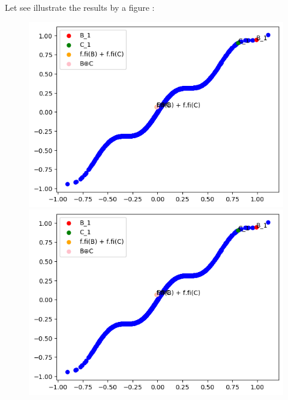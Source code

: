 \documentclass{report}
\begin{document}
            Let see illustrate the results by a figure :
            \begin{figure}[h]
                \centering
                \begin{minipage}{0.5\textwidth}
                \begin{minipage}{0.5\textwidth}
                    \centering
                    \includegraphics[width=0.9\linewidth]{./images/1.png}
                \end{minipage}%
                \begin{minipage}{0.5\textwidth}
                    \includegraphics[width=0.9\linewidth]{./images/1.png}
                \end{minipage}%
                \begin{minipage}{0.5\textwidth}
                    \centering

\end{minipage}
\end{minipage}
\end{figure}
\end{document}
